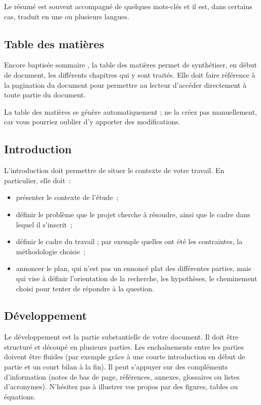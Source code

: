 Le résumé est souvent accompagné de quelques mots-clés et il est, dans
certains cas, traduit en une ou plusieurs langues.

\subsection{Table des matières}

Encore baptisée \og{} sommaire \fg{}, la table des matières permet de
synthétiser, en début de document, les différents chapitres qui y sont
traités. Elle doit faire
référence à la pagination du document pour permettre au lecteur
d'accéder directement à toute partie du document. 

La table des matières se génère automatiquement ; ne la créez pas
manuellement, car vous pourriez oublier d'y apporter des
modifications.

\subsection{Introduction}

L'introduction doit permettre de situer le contexte de votre travail. En
particulier, elle doit~:
\begin{itemize}
\item présenter le contexte de l'étude~;
\item définir le problème que le projet cherche à résoudre, ainsi
    que le cadre dans lequel il s'inscrit~; 
\item définir le cadre du travail ; par exemple quelles ont été les
  contraintes, la méthodologie choisie~;
\item annoncer le plan, qui n'est pas un ennoncé plat des différentes parties,
  mais qui vise à définir l'orientation de la recherche, les hypothèses, le
  cheminement choisi pour tenter de répondre à la question.
\end{itemize}


\subsection{Développement}

Le développement est la partie substantielle de votre document. Il doit être
structuré et découpé en plusieurs parties. Les enchaînements entre les parties
doivent être fluides (par exemple grâce à une courte introduction en début de
partie et un court bilan à la fin). Il peut s'appuyer sur des compléments
d'information (notes de bas de page, références, annexes, glossaires ou listes
d'acronymes). N'hésitez pas à illustrer vos propos par des figures, tables
ou équations.

